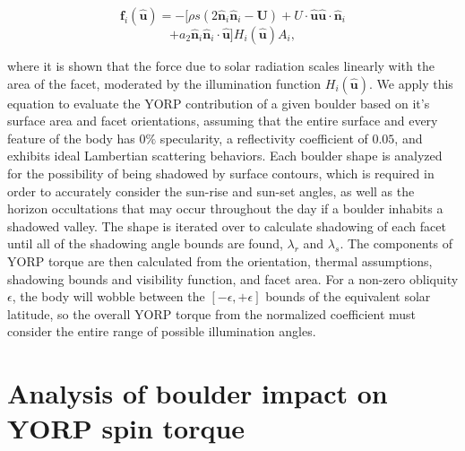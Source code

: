 \[
    \mathbf{f}_i (\mathbf{\hat{u}}) = -\big[ {\rho s(2\mathbf{\hat{n}}_i \mathbf{\hat{n}}_i - \mathbf{U}) + U} \cdot \mathbf{\hat{u}}\mathbf{\hat{u}} \cdot \mathbf{\hat{n}}_i  
\]
\begin{equation}
    + a_2\mathbf{\hat{n}}_i \mathbf{\hat{n}}_i \cdot \mathbf{\hat{u}}\big] H_i(\mathbf{\hat{u}})  A_i,
\end{equation}

where it is shown that the force due to solar radiation scales linearly with the area of the facet, moderated by the illumination function $H_i(\mathbf{\hat{u}})$. We apply this equation to evaluate the YORP contribution of a given boulder based on it's surface area and facet orientations, assuming that the entire surface and every feature of the body has 0$\%$ specularity, a reflectivity coefficient of $0.05$, and exhibits ideal Lambertian scattering behaviors. 
Each boulder shape is analyzed for the possibility of being shadowed by surface contours, which is required in order to accurately consider the sun-rise and sun-set angles, as well as the horizon occultations that may occur throughout the day if a boulder inhabits a shadowed valley. The shape is iterated over to calculate shadowing of each facet until all of the shadowing angle bounds are found, $\lambda_r$ and $\lambda_s$. The components of YORP torque are then calculated from the orientation, thermal assumptions, shadowing bounds and visibility function, and facet area. For a non-zero obliquity $\epsilon$, the body will wobble between the $[-\epsilon,+\epsilon]$ bounds of the equivalent solar latitude, so the overall YORP torque from the normalized coefficient must consider the entire range of possible illumination angles. 

\section{Analysis of boulder impact on YORP spin torque}\label{analysis} %

